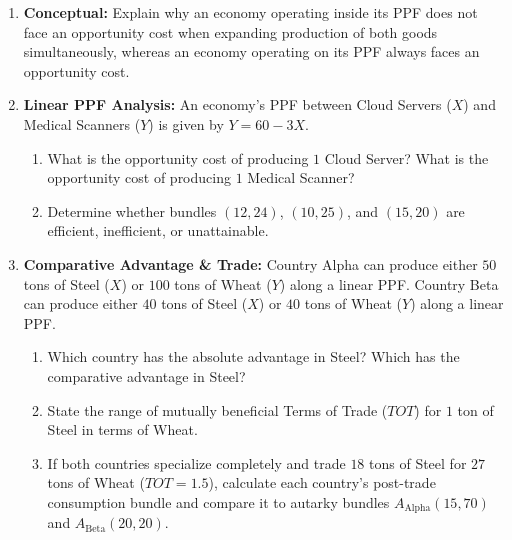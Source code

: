 \documentclass[11pt,letterpaper]{article}
\begin{document}
\begin{enumerate}
    \item \textbf{Conceptual:} Explain why an economy operating inside its PPF does not face an opportunity cost when expanding production of both goods simultaneously, whereas an economy operating on its PPF always faces an opportunity cost.
    \item \textbf{Linear PPF Analysis:} An economy's PPF between Cloud Servers ($X$) and Medical Scanners ($Y$) is given by $Y = 60 - 3X$.
    \begin{enumerate}
        \item What is the opportunity cost of producing $1$ Cloud Server? What is the opportunity cost of producing $1$ Medical Scanner?
        \item Determine whether bundles $(12, 24)$, $(10, 25)$, and $(15, 20)$ are efficient, inefficient, or unattainable.
    \end{enumerate}
    \item \textbf{Comparative Advantage \& Trade:} Country Alpha can produce either $50$ tons of Steel ($X$) or $100$ tons of Wheat ($Y$) along a linear PPF. Country Beta can produce either $40$ tons of Steel ($X$) or $40$ tons of Wheat ($Y$) along a linear PPF.
    \begin{enumerate}
        \item Which country has the absolute advantage in Steel? Which has the comparative advantage in Steel?
        \item State the range of mutually beneficial Terms of Trade ($TOT$) for $1$ ton of Steel in terms of Wheat.
        \item If both countries specialize completely and trade $18$ tons of Steel for $27$ tons of Wheat ($TOT = 1.5$), calculate each country's post-trade consumption bundle and compare it to autarky bundles $A_{\text{Alpha}}(15, 70)$ and $A_{\text{Beta}}(20, 20)$.
    \end{enumerate}
\end{enumerate}
\end{document}
